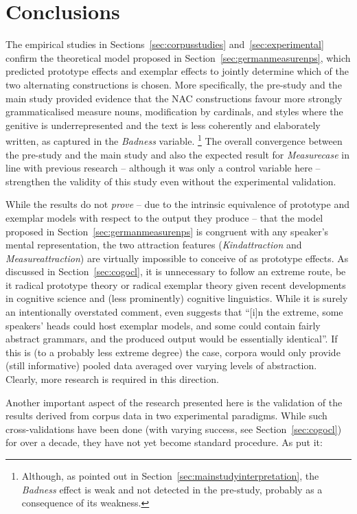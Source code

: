 \section{Conclusions}
\label{sec:conclusion}

The empirical studies in Sections~\ref{sec:corpusstudies} and~\ref{sec:experimental} confirm the theoretical model proposed in Section~\ref{sec:germanmeasurenps}, which predicted prototype effects and exemplar effects to jointly determine which of the two alternating constructions is chosen.
More specifically, the pre-study and the main study provided evidence that the NAC constructions favour more strongly grammaticalised measure nouns, modification by cardinals, and styles where the genitive is underrepresented and the text is less coherently and elaborately written, as captured in the \textit{Badness} variable.%
\footnote{Although, as pointed out in Section~\ref{sec:mainstudyinterpretation}, the \textit{Badness} effect is weak and not detected in the pre-study, probably as a consequence of its weakness.}
The overall convergence between the pre-study and the main study and also the expected result for \textit{Measurecase} in line with previous research \citep{Zimmer2015} -- although it was only a control variable here -- strengthen the validity of this study even without the experimental validation.

While the results do not \textit{prove} -- due to the intrinsic equivalence of prototype and exemplar models with respect to the output they produce -- that the model proposed in Section~\ref{sec:germanmeasurenps} is congruent with any speaker's mental representation, the two attraction features (\textit{Kindattraction} and \textit{Measureattraction}) are virtually impossible to conceive of as prototype effects.
As discussed in Section~\ref{sec:cogocl}, it is unnecessary to follow an extreme route, be it radical prototype theory or radical exemplar theory given recent developments in cognitive science and (less prominently) cognitive linguistics.
While it is surely an intentionally overstated comment, \citet[15]{Kapatsinski2014} even suggests that ``[i]n the extreme, some speakers’ heads could host exemplar models, and some could contain fairly abstract grammars, and the produced output would be essentially identical''.
If this is (to a probably less extreme degree) the case, corpora would only provide (still informative) pooled data averaged over varying levels of abstraction.
Clearly, more research is required in this direction.

Another important aspect of the research presented here is the validation of the results derived from corpus data in two experimental paradigms.
While such cross-validations have been done (with varying success, see Section~\ref{sec:cogocl}) for over a decade, they have not yet become standard procedure.
As \citet[3--4]{DivjakEa2016a} put it:

